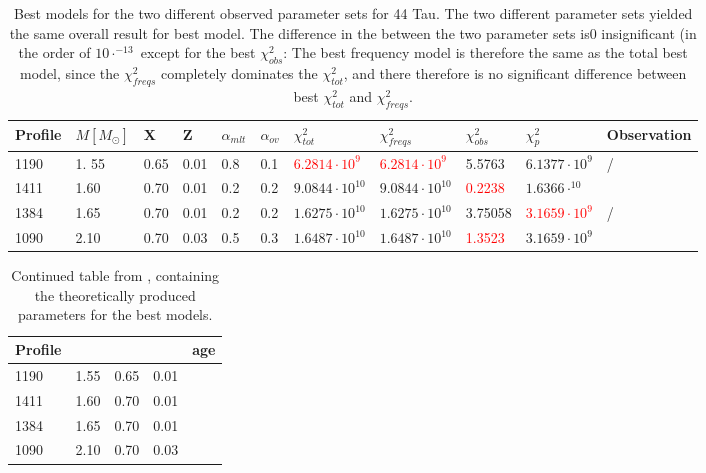 \begin{table}
	\caption{Best models for the two different observed parameter sets for 44 Tau. The two different parameter sets yielded the same overall result for best model. The difference in the \chis between the two parameter sets is0 insignificant (in the order of $10\cdot^{-13}$ except for the best $\chi_{obs}^2$: The best frequency model is therefore the same as the total best model, since the $\chi_{freqs}^2$ completely dominates the $\chi_{tot}^2$, and there therefore is no significant difference between best $\chi_{tot}^2$ and $\chi_{freqs}^2$. }
	\label{bestmodels}
	
	\begin{tabular}{lllllllllll}
		\toprule
		Profile & $M[M_\odot]$  & X & Z & $\alpha_{mlt}$ & $\alpha_{ov}$ & $\chi_{tot}^2$ &$\chi_{freqs}^2$ & $\chi_{obs}^2$ & $\chi_{p}^2$ & Observation\\
		\midrule
		1190 &1. 55 & 0.65  & 0.01  & 0.8  & 0.1  & \textcolor{red}{$6.2814 \cdot 10^{9}$} &  \textcolor{red}{$6.2814 \cdot 10^{9}$} & 5.5763 & $6.1377 \cdot 10^{9}$ &  \citet{lenz2010delta}/\citet{brown2018gaia}\\
		1411 & 1.60 & 0.70  & 0.01  & 0.2  & 0.2 &  $9.0844\cdot 10^{10}$ & $9.0844\cdot 10^{10}$ & \textcolor{red}{0.2238} & $1.6366 \cdot^{10}$ &  \citet{lenz2010delta}  \\
		1384 & 1.65 & 0.70 & 0.01 & 0.2  & 0.2  & $1.6275\cdot10^{10}$    & $1.6275 \cdot 10^{10} $ & 3.75058  & \textcolor{red}{$3.1659 \cdot 10^{9} $} & \citet{lenz2010delta}/\citet{brown2018gaia}\\
		1090 & 2.10 & 0.70 & 0.03 & 0.5  & 0.3  &  $1.6487\cdot10^{10}$    & $1.6487 \cdot 10^{10} $ & \textcolor{red}{1.3523}  & $3.1659 \cdot 10^{9} $ & \citet{brown2018gaia}\\
	\bottomrule
	\end{tabular}
\end{table}

\begin{table}
	\centering
	\caption{Continued table from , containing the theoretically produced parameters for the best models. }
	\label{bestmodels_continued}
	
	\begin{tabular}{lllll}
		\toprule
		Profile &  \teff & \logg & \lum & age \\
		\midrule
		1190 &1.55 & 0.65  & 0.01  &\\
		1411 & 1.60 & 0.70  & 0.01  &\\
		1384 & 1.65 & 0.70 & 0.01 &\\
		1090 & 2.10 & 0.70 & 0.03 &\\
		\bottomrule
	\end{tabular}
\end{table}

